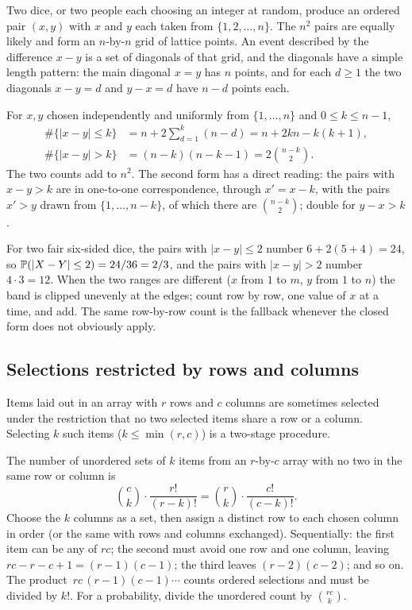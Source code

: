 Two dice, or two people each choosing an integer at random, produce an ordered pair $(x,y)$
with $x$ and $y$ each taken from $\{1,2,\dots,n\}$. The $n^2$ pairs are equally likely and
form an $n$-by-$n$ grid of lattice points. An event described by the difference $x-y$ is a
set of diagonals of that grid, and the diagonals have a simple length pattern: the main
diagonal $x=y$ has $n$ points, and for each $d\ge 1$ the two diagonals $x-y=d$ and
$y-x=d$ have $n-d$ points each.

\begin{keyfact}
For $x,y$ chosen independently and uniformly from $\{1,\dots,n\}$ and $0\le k\le n-1$,
\begin{align*}
\#\{|x-y|\le k\} &= n + 2\sum_{d=1}^{k}(n-d) = n + 2kn - k(k+1), \\
\#\{|x-y| > k\} &= (n-k)(n-k-1) = 2\binom{n-k}{2} .
\end{align*}
The two counts add to $n^2$. The second form has a direct reading: the pairs with
$x-y>k$ are in one-to-one correspondence, through $x' = x-k$, with the pairs $x'>y$ drawn
from $\{1,\dots,n-k\}$, of which there are $\binom{n-k}{2}$; double for $y-x>k$.
\end{keyfact}

For two fair six-sided dice, the pairs with $|x-y|\le 2$ number $6+2(5+4)=24$, so
$\mathbb{P}(|X-Y|\le 2) = 24/36 = 2/3$, and the pairs with $|x-y|>2$ number $4\cdot 3 = 12$.
When the two ranges are different ($x$ from $1$ to $m$, $y$ from $1$ to $n$) the band is
clipped unevenly at the edges; count row by row, one value of $x$ at a time, and add.
The same row-by-row count is the fallback whenever the closed form does not obviously apply.

\subsection{Selections restricted by rows and columns}

Items laid out in an array with $r$ rows and $c$ columns are sometimes selected under the
restriction that no two selected items share a row or a column. Selecting $k$ such items
($k\le\min(r,c)$) is a two-stage procedure.

\begin{keyfact}
The number of unordered sets of $k$ items from an $r$-by-$c$ array with no two in the same
row or column is
\[
\binom{c}{k}\cdot\frac{r!}{(r-k)!} = \binom{r}{k}\cdot\frac{c!}{(c-k)!} .
\]
Choose the $k$ columns as a set, then assign a distinct row to each chosen column in order
(or the same with rows and columns exchanged). Sequentially: the first item can be any of
$rc$; the second must avoid one row and one column, leaving $rc - r - c + 1 = (r-1)(c-1)$;
the third leaves $(r-2)(c-2)$; and so on. The product $\,rc\,(r-1)(c-1)\cdots$ counts ordered
selections and must be divided by $k!$. For a probability, divide the unordered count by
$\binom{rc}{k}$.
\end{keyfact}

